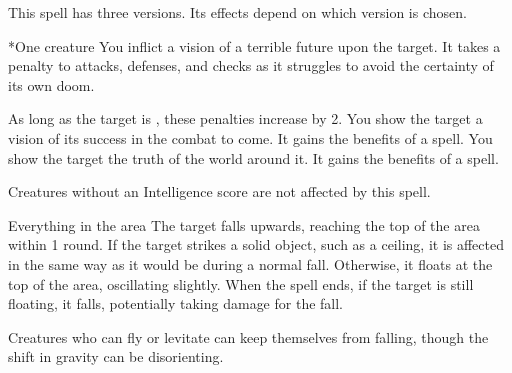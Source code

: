 \begin{spellheader}
    \spellrng{\rngmed}
    \spelldur{\durshort}
\end{spellheader}
\begin{spelleffects}
    \spellline
    \spellspecial This spell has three versions. Its effects depend on which version is chosen.
    \begin{spelltarget}*{One creature}
         You inflict a vision of a terrible future upon the target. It takes a  penalty to attacks, defenses, and checks as it struggles to avoid the certainty of its own doom.

        As long as the target is \bloodied, these penalties increase by 2.
         You show the target a vision of its success in the combat to come. It gains the benefits of a  spell.
         You show the target the truth of the world around it. It gains the benefits of a  spell.
    \end{spelltarget}
\end{spelleffects}
\begin{spellfooter}
    \spellnotes Creatures without an Intelligence score are not affected by this spell.
\end{spellfooter}

\begin{spellheader}
\end{spellheader}
\begin{spelleffects}
    \begin{spelltarget}{Everything in the area}
        \spelleffect The target falls upwards, reaching the top of the area within 1 round. If the target strikes a solid object, such as a ceiling, it is affected in the same way as it would be during a normal fall. Otherwise, it floats at the top of the area, oscillating slightly. When the spell ends, if the target is still floating, it falls, potentially taking damage for the fall.
    \end{spelltarget}
\end{spelleffects}
\begin{spellfooter}
    \spellnotes Creatures who can fly or levitate can keep themselves from falling, though the shift in gravity can be disorienting.
\end{spellfooter}

